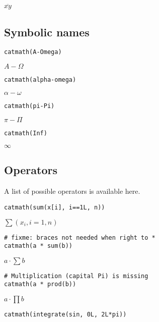 \(\overline{{xy}}\)

\hypertarget{symbolic-names}{%
\subsection{Symbolic names}\label{symbolic-names}}

\begin{verbatim}
catmath(A-Omega)
\end{verbatim}

\({{A}-\Omega}\)

\begin{verbatim}
catmath(alpha-omega)
\end{verbatim}

\({\alpha-\omega}\)

\begin{verbatim}
catmath(pi-Pi)
\end{verbatim}

\({\pi-\Pi}\)

\begin{verbatim}
catmath(Inf)
\end{verbatim}

\(\infty\)

\hypertarget{operators}{%
\subsection{Operators}\label{operators}}

A list of possible operators is available here.

\begin{verbatim}
catmath(sum(x[i], i==1L, n))
\end{verbatim}

\({{\sum}\left({{{x}_{i}}{,{{i}={1}}{,{n}}}}\right)}\)

\begin{verbatim}
# fixme: braces not needed when right to *
catmath(a * sum(b))
\end{verbatim}

\({{a}\cdot{{\sum}{b}}}\)

\begin{verbatim}
# Multiplication (capital Pi) is missing
catmath(a * prod(b))
\end{verbatim}

\({{a}\cdot{{\prod}{b}}}\)

\begin{verbatim}
catmath(integrate(sin, 0L, 2L*pi))
\end{verbatim}

